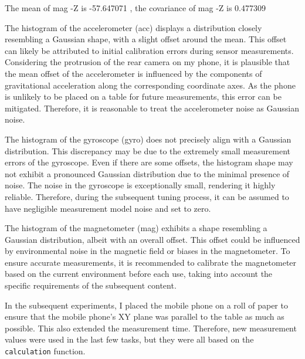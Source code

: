 The mean of mag -Z is -57.647071 
, the covariance of mag -Z is 0.477309 




The histogram of the accelerometer (acc) displays a distribution closely resembling a Gaussian shape, with a slight offset around the mean. This offset can likely be attributed to initial calibration errors during sensor measurements. Considering the protrusion of the rear camera on my phone, it is plausible that the mean offset of the accelerometer is influenced by the components of gravitational acceleration along the corresponding coordinate axes. As the phone is unlikely to be placed on a table for future measurements, this error can be mitigated. Therefore, it is reasonable to treat the accelerometer noise as Gaussian noise.

The histogram of the gyroscope (gyro) does not precisely align with a Gaussian distribution. This discrepancy may be due to the extremely small measurement errors of the gyroscope. Even if there are some offsets, the histogram shape may not exhibit a pronounced Gaussian distribution due to the minimal presence of noise. The noise in the gyroscope is exceptionally small, rendering it highly reliable. Therefore, during the subsequent tuning process, it can be assumed to have negligible measurement model noise and set to zero.

The histogram of the magnetometer (mag) exhibits a shape resembling a Gaussian distribution, albeit with an overall offset. This offset could be influenced by environmental noise in the magnetic field or biases in the magnetometer. To ensure accurate measurements, it is recommended to calibrate the magnetometer based on the current environment before each use, taking into account the specific requirements of the subsequent content.


In the subsequent experiments, I placed the mobile phone on a roll of paper to ensure that the mobile phone's XY plane was parallel to the table as much as possible. This also extended the measurement time. Therefore, new measurement values were used in the last few tasks, but they were all based on the \texttt{calculation} function.

